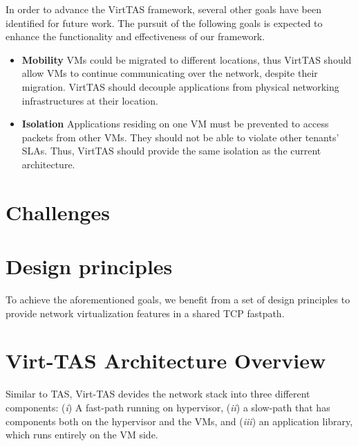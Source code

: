     In order to advance the VirtTAS framework, several other goals have been identified for 
    future work. The pursuit of the following goals is expected to enhance the functionality 
    and effectiveness of our framework. 
    
\begin{itemize}
    \item \textbf{Mobility} %
    VMs could be migrated to different locations, thus VirtTAS should allow VMs to continue 
    communicating over the network, despite their migration. VirtTAS should decouple applications 
    from physical networking infrastructures at their location.
    \item \textbf{Isolation} 
    Applications residing on one VM must be prevented to access packets from other VMs. 
    They should not be able to violate other tenants' SLAs. Thus, VirtTAS should provide 
    the same isolation as the current architecture.

\end{itemize}

\section{Challenges}

\section{Design principles}
To achieve the aforementioned goals, we benefit from a set of design principles 
to provide network virtualization features in a shared TCP fastpath.

\section{Virt-TAS Architecture Overview}

Similar to TAS, Virt-TAS devides the network stack into three different components:
(\emph{i}) A fast-path running on hypervisor, (\emph{ii}) a slow-path that has components
both on the hypervisor and the VMs, and (\emph{iii}) an application library, which 
runs entirely on the VM side. 



